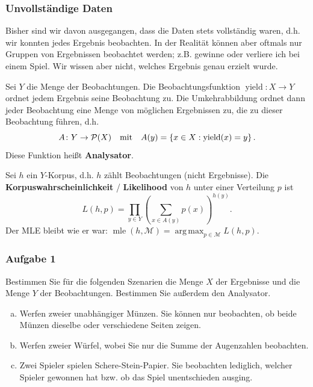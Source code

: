 \documentclass{beamer}
\DeclareMathOperator*{\argmax}{arg\,max}
\begin{document}
\begin{frame} \frametitle{Unvollständige Daten}
	\justifying \footnotesize
	Bisher sind wir davon ausgegangen, dass die Daten stets vollständig waren, d.h. wir konnten jedes Ergebnis beobachten. In der Realität können aber oftmals nur Gruppen von Ergebnissen beobachtet werden; z.B. gewinne oder verliere ich bei einem Spiel. Wir wissen aber nicht, welches Ergebnis genau erzielt wurde. 
	
	Sei $Y$ die Menge der Beobachtungen. Die Beobachtungsfunktion $\operatorname{yield} \colon X \to Y$ ordnet jedem Ergebnis seine Beobachtung zu. Die Umkehrabbildung ordnet dann jeder Beobachtung eine Menge von möglichen Ergebnissen zu, die zu dieser Beobachtung führen, d.h.
	\begin{equation*}
		A \colon Y \to \mathcal{P}(X) \quad \text{mit} \quad A(y) = \left\{ x \in X: \operatorname{yield}(x) = y \right\} .
	\end{equation*}
	Diese Funktion heißt \textbf{Analysator}. 
	
	Sei $h$ ein $Y$-Korpus, d.h. $h$ zählt Beobachtungen (nicht Ergebnisse). Die \textbf{Korpuswahrscheinlichkeit} / \textbf{Likelihood} von $h$ unter einer Verteilung $p$ ist 
	\begin{equation*}
		L(h,p) = \prod_{y \in Y} \left( \sum_{x \in A(y)} p(x) \right)^{h(y)}.
	\end{equation*}
	Der MLE bleibt wie er war: $\operatorname{mle}(h,\mathcal{M}) = \argmax_{p \in \mathcal{M}} L(h,p)$.
\end{frame}

\begin{frame} \frametitle{Aufgabe 1}
	\small
	Bestimmen Sie für die folgenden Szenarien die Menge $X$ der Ergebnisse und die Menge $Y$ der
	Beobachtungen. Bestimmen Sie außerdem den Analysator.
	\begin{enumerate}[(a)]
		\item Werfen zweier unabhängiger Münzen. Sie können nur beobachten, ob beide Münzen dieselbe oder verschiedene Seiten zeigen.
		\item Werfen zweier Würfel, wobei Sie nur die Summe der Augenzahlen beobachten.
		\item Zwei Spieler spielen Schere-Stein-Papier. Sie beobachten lediglich, welcher Spieler gewonnen hat bzw. ob das Spiel unentschieden ausging.
	\end{enumerate}
\end{frame}
\end{document}
